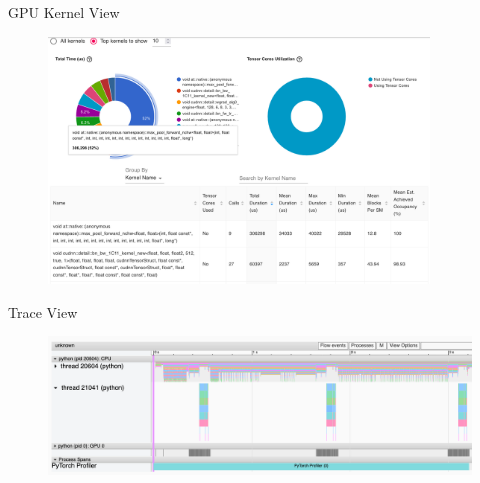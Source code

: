 \documentclass[compress,aspectratio=169]{beamer}
\begin{document}
\begin{frame}{GPU Kernel View}
    \vspace{-1em}
\begin{center}
    \begin{figure}
        \includegraphics[width=0.9\textwidth]{../../data/scap_gtx1080_profiler-torch_batch-size-64_14650758_gpu-kernel-view}
    \end{figure}
    \end{center}
\end{frame}

\begin{frame}{Trace View}
    \vspace{-1em}
\begin{center}
    \begin{figure}
        \includegraphics[width=1\textwidth]{../../data/scap_gtx1080_profiler-torch_batch-size-64_14650758_trace-view}
    \end{figure}
    \end{center}
\end{frame}
\end{document}
